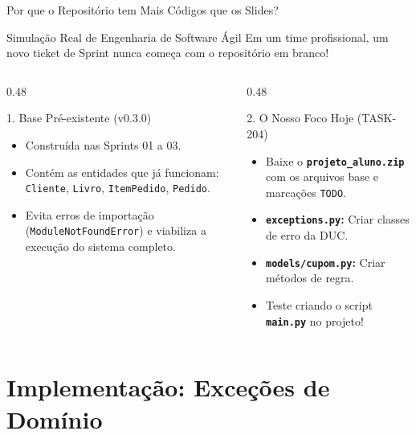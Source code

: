 \documentclass[10pt]{beamer}
\begin{document}
\begin{frame}{Por que o Repositório tem Mais Códigos que os Slides?}
    \begin{alertblock}{Simulação Real de Engenharia de Software Ágil}
    Em um time profissional, um novo ticket de Sprint nunca começa com o repositório em branco!
    \end{alertblock}
    \vspace{0.2cm}
    \begin{columns}[T]
        \begin{column}{0.48\textwidth}
            \begin{block}{\footnotesize 1. Base Pré-existente (v0.3.0)}
            \scriptsize
            \begin{itemize}
                \item Construída nas Sprints 01 a 03.
                \item Contém as entidades que já funcionam: \texttt{Cliente}, \texttt{Livro}, \texttt{ItemPedido}, \texttt{Pedido}.
                \item Evita erros de importação (\texttt{ModuleNotFoundError}) e viabiliza a execução do sistema completo.
            \end{itemize}
            \end{block}
        \end{column}
        \begin{column}{0.48\textwidth}
            \begin{block}{\footnotesize 2. O Nosso Foco Hoje (TASK-204)}
            \scriptsize
            \begin{itemize}
                \item Baixe o \textbf{\texttt{projeto\_aluno.zip}} com os arquivos base e marcações \texttt{TODO}.
                \item \textbf{\texttt{exceptions.py}:} Criar classes de erro da DUC.
                \item \textbf{\texttt{models/cupom.py}:} Criar métodos de regra.
                \item Teste criando o script \textbf{\texttt{main.py}} no projeto!
            \end{itemize}
            \end{block}
        \end{column}
    \end{columns}
\end{frame}

\section{Implementação: Exceções de Domínio}
\end{document}
